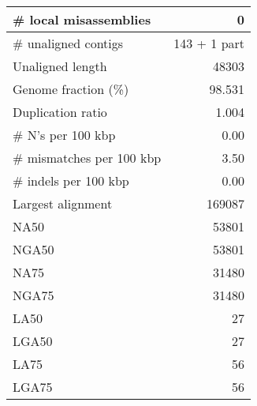 \documentclass[12pt,a4paper]{article}
\begin{document}
\begin{table}[ht]
\begin{center}
\begin{tabular}{|l*{1}{|r}|}
\# local misassemblies & 0 \\ \hline
\# unaligned contigs & 143 + 1 part \\ \hline
Unaligned length & 48303 \\ \hline
Genome fraction (\%) & 98.531 \\ \hline
Duplication ratio & 1.004 \\ \hline
\# N's per 100 kbp & 0.00 \\ \hline
\# mismatches per 100 kbp & 3.50 \\ \hline
\# indels per 100 kbp & 0.00 \\ \hline
Largest alignment & 169087 \\ \hline
NA50 & 53801 \\ \hline
NGA50 & 53801 \\ \hline
NA75 & 31480 \\ \hline
NGA75 & 31480 \\ \hline
LA50 & 27 \\ \hline
LGA50 & 27 \\ \hline
LA75 & 56 \\ \hline
LGA75 & 56 \\ \hline
\end{tabular}
\end{center}
\end{table}
\end{document}
